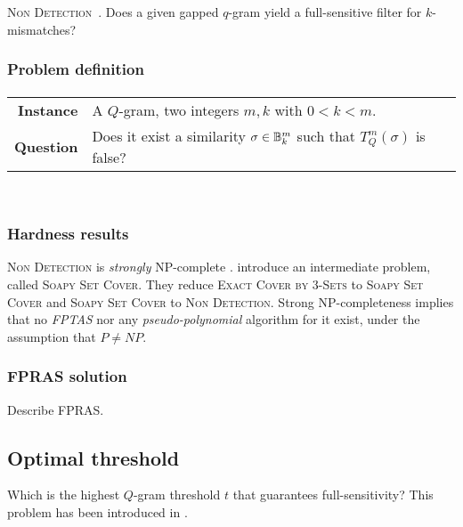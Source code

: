 \textsc{Non Detection}~\citep{Nicolas2005}. Does a given gapped $q$-gram yield a full-sensitive filter for $k$-mismatches?

\subsubsection{Problem definition}

\paragraph{}
\begin{tabular}{rl}
{\bf Instance}	&	A $Q$-gram, two integers $m,k$ with $0 < k < m$. \\
{\bf Question}	&	Does it exist a similarity $\sigma \in \mathbb {B}^{m}_{k}$ such that $T_{Q}^{m}(\sigma)$ is false? \\
\end{tabular}
\\

\subsubsection{Hardness results}

\textsc{Non Detection} is \emph{strongly} NP-complete \citep{Nicolas2005}.
\citeauthor{Nicolas2005} introduce an intermediate problem, called \textsc{Soapy Set Cover}. They reduce \textsc{Exact Cover by 3-Sets} to \textsc{Soapy Set Cover} and \textsc{Soapy Set Cover} to \textsc{Non Detection}.
Strong NP-completeness implies that no \emph{FPTAS} nor any \emph{pseudo-polynomial} algorithm for it exist, under the assumption that $P \neq NP$.

\subsubsection{FPRAS solution}


Describe FPRAS.


\subsection{Optimal threshold}

Which is the highest $Q$-gram threshold $t$ that guarantees full-sensitivity?
This problem has been introduced in \citep{Burkhardt2001}. %

